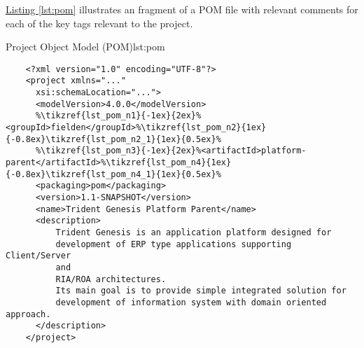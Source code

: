   \hyperref[lst:pom]{Listing \ref{lst:pom}} illustrates an fragment of a POM file with relevant comments for each of the key tags relevant to the project.


  \clearpage
  \begin{code}{Project Object Model (POM)}{lst:pom}
    \begin{lstlisting}
    <?xml version="1.0" encoding="UTF-8"?>
    <project xmlns="..."
	  xsi:schemaLocation="...">
	  <modelVersion>4.0.0</modelVersion>
	  %\tikzref{lst_pom_n1}{-1ex}{2ex}%<groupId>fielden</groupId>%\tikzref{lst_pom_n2}{1ex}{-0.8ex}\tikzref{lst_pom_n2_1}{1ex}{0.5ex}%
	  %\tikzref{lst_pom_n3}{-1ex}{2ex}%<artifactId>platform-parent</artifactId>%\tikzref{lst_pom_n4}{1ex}{-0.8ex}\tikzref{lst_pom_n4_1}{1ex}{0.5ex}%
	  <packaging>pom</packaging>
	  <version>1.1-SNAPSHOT</version>
	  <name>Trident Genesis Platform Parent</name>
	  <description>
		  Trident Genesis is an application platform designed for
		  development of ERP type applications supporting Client/Server
		  and
		  RIA/ROA architectures.
		  Its main goal is to provide simple integrated solution for 
		  development of information system with domain oriented approach. 
	  </description>
    </project> 
    \end{lstlisting}
  \end{code}


